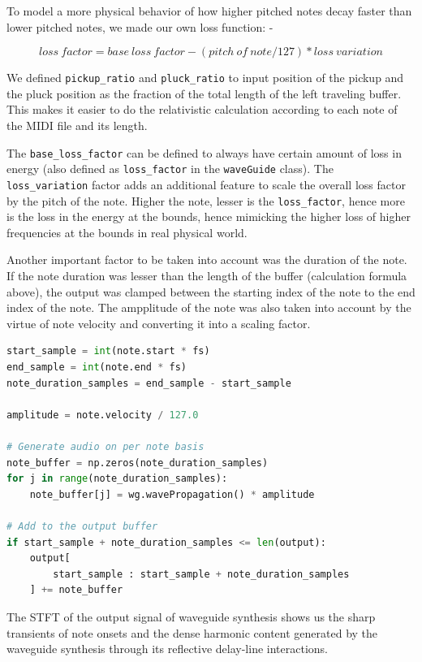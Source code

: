 \documentclass[11pt]{article}
\begin{document}
To model a more physical behavior of how higher pitched notes decay faster than lower pitched notes, we made our own loss function: - 

\begin{equation}
    loss\ factor = base\ loss\ factor - (pitch \ of\ note/127)*loss\ variation
\end{equation}

We defined \texttt{pickup\_ratio} and \texttt{pluck\_ratio} to input position of the pickup and the pluck position as the fraction of the total length of the left traveling buffer. This makes it easier to do the relativistic calculation according to each note of the MIDI file and its length. 

The \texttt{base\_loss\_factor} can be defined to always have certain amount of loss in energy (also defined as \texttt{loss\_factor} in the \texttt{waveGuide} class). The \texttt{loss\_variation} factor adds an additional feature to scale the overall loss factor by the pitch of the note. Higher the note, lesser is the \texttt{loss\_factor}, hence more is the loss in the energy at the bounds, hence mimicking the higher loss of higher frequencies at the bounds in real physical world. 

Another important factor to be taken into account was the duration of the note. If the note duration was lesser than the length of the buffer (calculation formula above), the output was clamped between the starting index of the note to the end index of the note. The ampplitude of the note was also taken into account by the virtue of note velocity and converting it into a scaling factor.

\begin{lstlisting}[language= Python]
start_sample = int(note.start * fs)
end_sample = int(note.end * fs)
note_duration_samples = end_sample - start_sample

amplitude = note.velocity / 127.0

# Generate audio on per note basis
note_buffer = np.zeros(note_duration_samples)
for j in range(note_duration_samples):
    note_buffer[j] = wg.wavePropagation() * amplitude

# Add to the output buffer
if start_sample + note_duration_samples <= len(output):
    output[
        start_sample : start_sample + note_duration_samples
    ] += note_buffer
\end{lstlisting}

The STFT of the output signal of waveguide synthesis shows us the sharp transients of note onsets and the dense harmonic content generated by the waveguide synthesis through its reflective delay-line interactions.
\end{document}
